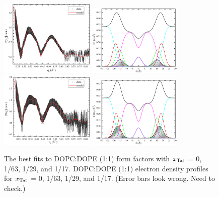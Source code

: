 \begin{figure}[htbp]
  \includegraphics[width=0.4\textwidth]{figures/Tat/SDP_Results/XFF/DOPCDOPE1to1_Tat_28to1_3p0_XFF1}
  \includegraphics[width=0.4\textwidth]{./figures/Tat/SDP_Results/EDP/DOPCDOPE1to1_Tat_28to1_3p0_EDP1}
  \includegraphics[width=0.4\textwidth]{figures/Tat/SDP_Results/XFF/DOPCDOPE1to1_Tat_16to1_3p0_XFF1}
  \includegraphics[width=0.4\textwidth]{./figures/Tat/SDP_Results/EDP/DOPCDOPE1to1_Tat_16to1_3p0_EDP1}
  \caption{The best fits to DOPC:DOPE (1:1) form factors with 
  $x_\textrm{Tat}$ = 0, 1/63, 1/29, and 1/17.
  DOPC:DOPE (1:1) electron density profiles for $x_\textrm{Tat}$ = 0, 1/63,
  1/29, and 1/17. (Error bars look wrong. Need to check.)}
  \label{fig:DOPCDOPE1to1_Tat_XFF1}
\end{figure}
